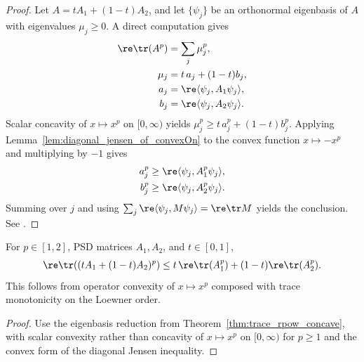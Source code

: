 \begin{proof}\leanok
    Let $A=tA_1+(1-t)A_2$, and let $\{\psi_j\}$ be an orthonormal eigenbasis
    of $A$ with eigenvalues $\mu_j\ge0$. A direct computation gives
    \begin{align}
        \re\tr(A^p)
        &=\sum_j\mu_j^p,
        \notag\\
        \mu_j
        &=t\,a_j+(1-t)b_j,
        \notag\\
        a_j
        &=\re\langle\psi_j,A_1\psi_j\rangle,
        \notag\\
        b_j
        &=\re\langle\psi_j,A_2\psi_j\rangle.
        \notag
    \end{align}
    Scalar concavity of $x\mapsto x^p$ on $[0,\infty)$ yields
    $\mu_j^p\ge t\,a_j^p+(1-t)b_j^p$. Applying
    Lemma~\ref{lem:diagonal_jensen_of_convexOn} to the convex function
    $x\mapsto-x^p$ and multiplying by $-1$ gives
    \begin{align}
        a_j^p
        &\ge\re\langle\psi_j,A_1^p\psi_j\rangle,
        \notag\\
        b_j^p
        &\ge\re\langle\psi_j,A_2^p\psi_j\rangle.
        \notag
    \end{align}
    Summing over $j$ and using
    $\sum_j\re\langle\psi_j,M\psi_j\rangle=\re\tr M$ yields the conclusion.
    See \cite[Chapter~V]{Bhatia1997Matrix}.
\end{proof}

\begin{theorem}\label{thm:trace_rpow_convex}
    \leanok
    For $p\in[1,2]$, PSD matrices $A_1,A_2$, and $t\in[0,1]$,
    \begin{align}
        \re\tr\!\left((tA_1+(1-t)A_2)^p\right)
        \le
        t\,\re\tr(A_1^p)+(1-t)\re\tr(A_2^p).
        \notag
    \end{align}
    This follows from operator convexity of $x\mapsto x^p$ composed with trace
    monotonicity on the Loewner order.
\end{theorem}

\begin{proof}\leanok
    Use the eigenbasis reduction from
    Theorem~\ref{thm:trace_rpow_concave}, with scalar convexity rather than
    concavity of $x\mapsto x^p$ on $[0,\infty)$ for $p\ge1$ and the convex
    form of the diagonal Jensen inequality.
\end{proof}

